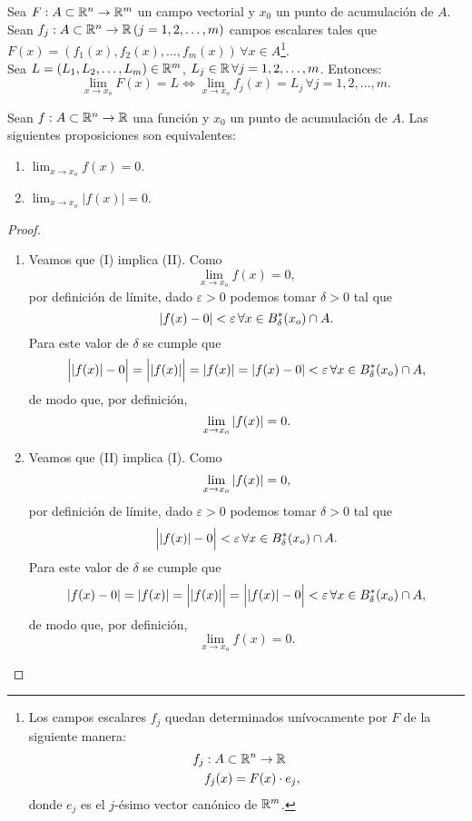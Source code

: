 \begin{propertie} \label{prop:lim_x_comp}
 Sea $F: A \subset \mathbb{R}^n \to \mathbb{R}^m$ un campo vectorial y $x_0$ un punto de acumulaci\'on de $A$. Sean $f_j: A \subset \mathbb{R}^n \to \mathbb{R} \, (j = 1,2, \dots, m)$ campos escalares tales que $F(x) = \left( f_1(x), f_2(x), \dots, f_m(x) \right) \, \forall x \in A$\footnote{Los campos escalares $f_j$ quedan determinados un\'ivocamente por $F$ de la siguiente manera: 
 \begin{align*}
     f_j &: A \subset \mathbb{R}^n \to \mathbb{R} \\
     &f_j(x) = F(x) \cdot e_j,
 \end{align*} donde $e_j$ es el $j$-\'esimo vector can\'onico de $\mathbb{R}^m$.}.\\
 Sea $L = \left( L_1, L_2, \dots, L_m \right) \in \mathbb{R}^m$, $L_j \in \mathbb{R} \, \forall j = 1,2, \dots, m$. Entonces:
 \[
  \lim_{x \to x_o} F(x) = L \iff \lim_{x \to x_o} f_j(x) = L_j \, \forall j = 1,2, \dots, m.
 \]

\end{propertie}


  \begin{propertie} \label{prop:lim_1}
    Sean $f:A \subset \mathbb{R}^n \to \mathbb{R}$ una funci\'on y $x_0$ un punto de acumulaci\'on de $A$. Las siguientes proposiciones son equivalentes:
 \begin{enumerate} %
  \item $\lim_{x \to x_o} f(x) = 0$.
  \item $\lim_{x \to x_o} | f(x) | = 0$.
 \end{enumerate}
 \begin{proof}
 \mbox{}
 
 \begin{enumerate} %
  \item Veamos que (I) implica (II). Como 
  \[
   \lim_{x \to x_o} f(x) = 0,
  \]
  por definici\'on de l\'imite, dado $\varepsilon > 0$ podemos tomar $\delta > 0$ tal que 
  \[
   \abs{f(x) - 0} < \varepsilon \, \forall x \in B^*_{\delta}(x_o) \cap A.
  \]
  Para este valor de $\delta$ se cumple que
  \[
   \Big| \abs{f(x)} - 0 \Big| = \Big| \abs{f(x)} \Big| = \abs{f(x)} = \abs{f(x) - 0} < \varepsilon \, 
   \forall x \in B^*_{\delta}(x_o) \cap A,
  \]
  de modo que, por definici\'on, 
  \[
   \lim_{x \to x_o} \abs{ f(x) } = 0.
  \]
  \item Veamos que (II) implica (I). Como
  \[
   \lim_{x \to x_o} \abs{ f(x) } = 0,
  \]
  por definici\'on de l\'imite, dado $\varepsilon > 0$ podemos tomar $\delta > 0$ tal que 
  \[
   \Big| \abs{f(x)} - 0 \Big| < \varepsilon \, \forall x \in B^*_{\delta}(x_o) \cap A.
  \]
  Para este valor de $\delta$ se cumple que
  \[
   \abs{f(x) - 0} = \abs{f(x)} = \Big| \abs{f(x)} \Big| = \Big| \abs{f(x)} - 0 \Big| < \varepsilon \, 
   \forall x \in B^*_{\delta}(x_o) \cap A,
  \]
  de modo que, por definici\'on, 
  \[
   \lim_{x \to x_o} f(x) = 0.
  \]
 \end{enumerate}

  
 \end{proof}

\end{propertie} 

